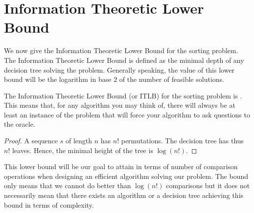 \section{Information Theoretic Lower Bound}
\label{tree:sorting:ITLB}

We now give the Information Theoretic Lower Bound for the sorting problem. The
Information Theoretic Lower Bound is defined as the minimal depth of any
decision tree solving the problem. Generally speaking, the value of this lower
bound will be the logarithm in base \(2\) of the number of feasible solutions.


\begin{theorem}
The Information Theoretic Lower Bound (or ITLB) for the sorting problem is
. This means that, for any algorithm you may think of,
there will always be at least an instance of the problem that will force your
algorithm to ask  questions to the oracle.
\end{theorem}

\begin{proof}
A sequence \(s\) of length \(n\) has \(n!\) permutations. The decision tree has thus
\(n!\) leaves. Hence, the minimal height of the tree is \(\log(n!)\).
\end{proof}

This lower bound will be our goal to attain in terms of number of comparison
operations when designing an efficient algorithm solving our problem. The
bound only means that we cannot do better than \(\log(n!)\) comparisons but it
does not necessarily mean that there exists an algorithm or a decision tree
achieving this bound in terms of complexity.
